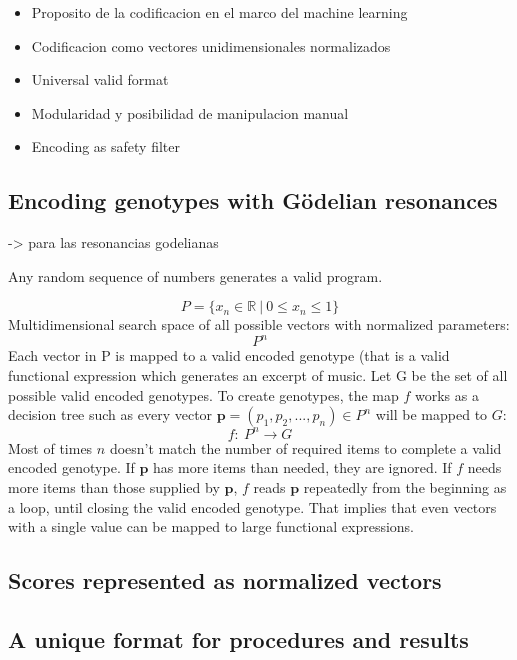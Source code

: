 \documentclass{article}
\renewcommand{\vec}[1]{\mathbf{#1}}
\begin{document}
{\color{gray}


\begin{itemize}
\item Proposito de la codificacion en el marco del machine learning
\item Codificacion como vectores unidimensionales normalizados
\item Universal valid format
\item Modularidad y posibilidad de manipulacion manual
\item Encoding as safety filter

\end{itemize}

}

\subsection{Encoding genotypes with G{\"o}delian resonances}

{\color{red}

\cite{deLemosAlmada2017} -> para las resonancias godelianas

}


Any random sequence of numbers generates a valid program. 

$$ P = \{x_n \in \mathbb{R} \: | \: 0 \leq x_n \leq1 \} $$
Multidimensional search space of all possible vectors with normalized parameters:
$$ P^n $$
Each vector in P is mapped to a valid encoded genotype (that is a valid functional expression which generates an excerpt of music.
Let G be the set of all possible valid encoded genotypes. To create genotypes, the map $f$ works as a decision tree such as every vector $\vec{p} = (p_1, p_2, ..., p_n) \in P^n$ will be mapped to $G$: 
$$f:\ P^n\to G$$
Most of times $n$ doesn't match the number of required items to complete a valid encoded genotype. If $\vec{p}$ has more items than needed, they are ignored. If $f$ needs more items than those supplied by $\vec{p}$, $f$ reads $\vec{p}$ repeatedly from the beginning as a loop, until closing the valid encoded genotype. That implies that even vectors with a single value can be mapped to large functional expressions.  



\subsection{Scores represented as normalized vectors}
\subsection{A unique format for procedures and results}
\end{document}

